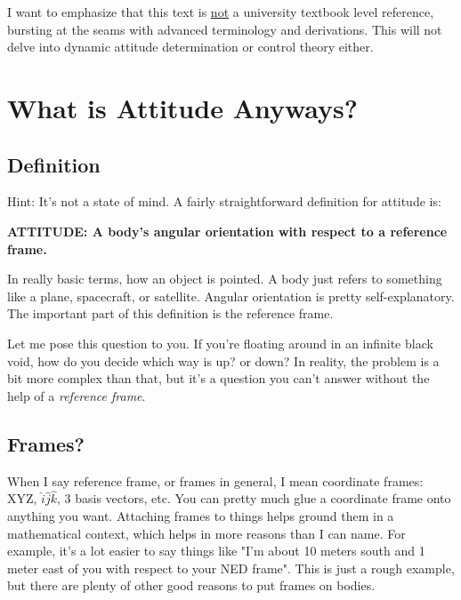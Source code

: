 \documentclass[a4paper,14pt]{extreport}
\begin{document}
I want to emphasize that this text is \underline{not} a university textbook level reference, bursting at the seams with advanced terminology and derivations. This will not delve into dynamic attitude determination or control theory either.

\chapter{What is Attitude Anyways?}

\section{Definition}
Hint: It's not a state of mind. A fairly straightforward definition for attitude is:

\begin{center}
\textbf{ATTITUDE: A body's angular orientation with respect to a reference frame.}
\end{center}

In really basic terms, how an object is pointed. A body just refers to something like a plane, spacecraft, or satellite. Angular orientation is pretty self-explanatory. The important part of this definition is the reference frame. 

Let me pose this question to you. If you're floating around in an infinite black void, how do you decide which way is up? or down? In reality, the problem is a bit more complex than that, but it's a question you can't answer without the help of a \textit{reference frame}.

\section{Frames?}

When I say reference frame, or frames in general, I mean coordinate frames: XYZ, \(\hat{i}\hat{j}\hat{k}\), 3 basis vectors, etc. You can pretty much glue a coordinate frame onto anything you want. Attaching frames to things helps ground them in a mathematical context, which helps in more reasons than I can name. For example, it's a lot easier to say things like "I'm about 10 meters south and 1 meter east of you with respect to your NED frame". This is just a rough example, but there are plenty of other good reasons to put frames on bodies.
\end{document}
